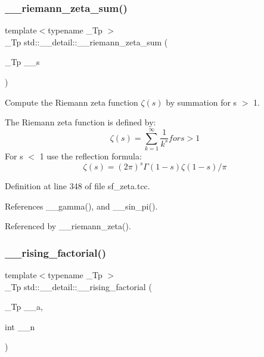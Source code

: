 \subsubsection{\texorpdfstring{\+\_\+\+\_\+riemann\+\_\+zeta\+\_\+sum()}{\_\_riemann\_zeta\_sum()}}
{\footnotesize\ttfamily template$<$typename \+\_\+\+Tp $>$ \\
\+\_\+\+Tp std\+::\+\_\+\+\_\+detail\+::\+\_\+\+\_\+riemann\+\_\+zeta\+\_\+sum (\begin{DoxyParamCaption}\item[{\+\_\+\+Tp}]{\+\_\+\+\_\+s }\end{DoxyParamCaption})}



Compute the Riemann zeta function $ \zeta(s) $ by summation for s $>$ 1. 

The Riemann zeta function is defined by\+: \[ \zeta(s) = \sum_{k=1}^{\infty} \frac{1}{k^{s}} for s > 1 \] For s $<$ 1 use the reflection formula\+: \[ \zeta(s) = (2\pi)^s \Gamma(1-s) \zeta(1-s) / \pi \] 

Definition at line 348 of file sf\+\_\+zeta.\+tcc.



References \+\_\+\+\_\+gamma(), and \+\_\+\+\_\+sin\+\_\+pi().



Referenced by \+\_\+\+\_\+riemann\+\_\+zeta().

\mbox{\label{namespacestd_1_1____detail_a5a4c41ee568639f8de4508051da9954a}} 
\subsubsection{\texorpdfstring{\+\_\+\+\_\+rising\+\_\+factorial()}{\_\_rising\_factorial()}\hspace{0.1cm}{\footnotesize\ttfamily [1/2]}}
{\footnotesize\ttfamily template$<$typename \+\_\+\+Tp $>$ \\
\+\_\+\+Tp std\+::\+\_\+\+\_\+detail\+::\+\_\+\+\_\+rising\+\_\+factorial (\begin{DoxyParamCaption}\item[{\+\_\+\+Tp}]{\+\_\+\+\_\+a,  }\item[{int}]{\+\_\+\+\_\+n }\end{DoxyParamCaption})}



